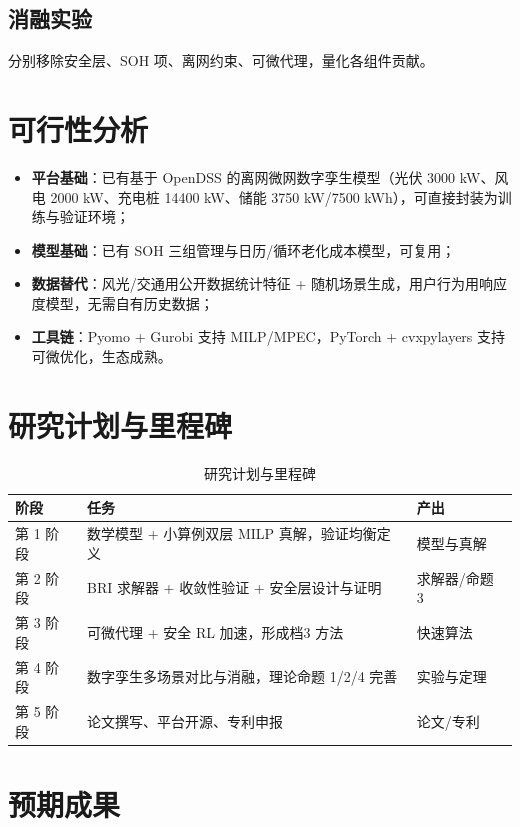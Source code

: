 \documentclass[UTF8,a4paper,11pt]{ctexart}
\begin{document}
\subsection{消融实验}
分别移除安全层、SOH 项、离网约束、可微代理，量化各组件贡献。

\section{可行性分析}

\begin{itemize}
  \item \textbf{平台基础}：已有基于 OpenDSS 的离网微网数字孪生模型（光伏 3000 kW、风电 2000 kW、充电桩 14400 kW、储能 3750 kW/7500 kWh），可直接封装为训练与验证环境；
  \item \textbf{模型基础}：已有 SOH 三组管理与日历/循环老化成本模型，可复用；
  \item \textbf{数据替代}：风光/交通用公开数据统计特征 + 随机场景生成，用户行为用响应度模型，无需自有历史数据；
  \item \textbf{工具链}：Pyomo + Gurobi 支持 MILP/MPEC，PyTorch + cvxpylayers 支持可微优化，生态成熟。
\end{itemize}

\section{研究计划与里程碑}

\begin{table}[htbp]
\centering
\small
\caption{研究计划与里程碑}
\begin{tabular}{p{2.2cm} p{10.0cm} p{2.4cm}}
\toprule
\textbf{阶段} & \textbf{任务} & \textbf{产出}\\
\midrule
第 1 阶段 & 数学模型 + 小算例双层 MILP 真解，验证均衡定义 & 模型与真解\\
第 2 阶段 & BRI 求解器 + 收敛性验证 + 安全层设计与证明 & 求解器/命题 3\\
第 3 阶段 & 可微代理 + 安全 RL 加速，形成档3 方法 & 快速算法\\
第 4 阶段 & 数字孪生多场景对比与消融，理论命题 1/2/4 完善 & 实验与定理\\
第 5 阶段 & 论文撰写、平台开源、专利申报 & 论文/专利\\
\bottomrule
\end{tabular}
\end{table}

\section{预期成果}
\end{document}
